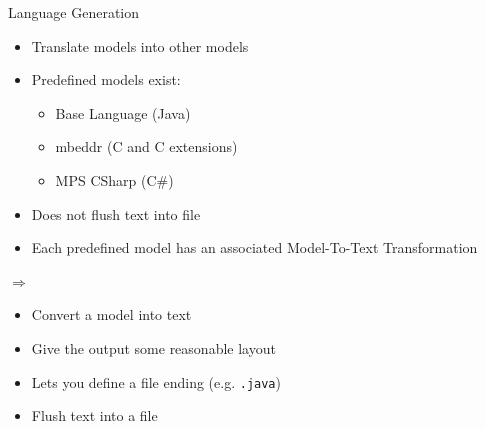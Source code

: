 \begin{frame}{Language Generation}
		\begin{minipage}{0.4\textwidth}
			\begin{itemize}
				\item Translate models into other models
				\item Predefined models exist:
				\begin{itemize}
					\item Base Language (Java)
					\item mbeddr (C and C extensions) \footnotemark[8]
					\item MPS CSharp (C\#) \footnotemark[9]
				\end{itemize}
				\item Does not flush text into file
				\item Each predefined model has an associated Model-To-Text Transformation
			\end{itemize}
		\end{minipage} 
		\begin{minipage}{0.09\textwidth}
			\Large
			$\Rightarrow$
		\end{minipage}
		\begin{minipage}{0.4\textwidth}
			\begin{itemize}
				\item Convert a model into text
				\item Give the output some reasonable layout
				\item Lets you define a file ending (e.g. \texttt{.java})
				\item Flush text into a file
			\end{itemize}
		\end{minipage}
	\end{frame}


